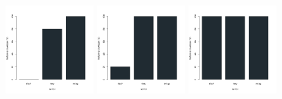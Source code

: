 \begin{figure}[H]
\centering
\includegraphics[width=0.3\textwidth]{img/solver_instance_coverage_b=2_m_60s.png}
\includegraphics[width=0.3\textwidth]{img/solver_instance_coverage_b=2_m_600s.png}
\includegraphics[width=0.3\textwidth]{img/solver_instance_coverage_b=2_m_1200s.png}
\caption*{\textsc{Zeitlimit} $1min$ $\quad\quad\quad$ \textsc{Zeitlimit} $10min$ $\quad\quad\quad$ \textsc{Zeitlimit} $20min$}
\begin{subfigure}[b]{0.3\textwidth}
\centering
{}

\end{subfigure}
\end{figure}
